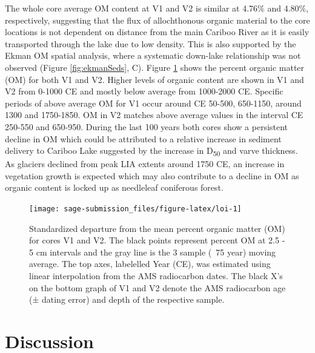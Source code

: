 \documentclass[Royal,times,doublespace,sageh]{sagej}
\begin{document}
The whole core average OM content at V1 and V2 is similar at 4.76\% and
4.80\%, respectively, suggesting that the flux of allochthonous organic
material to the core locations is not dependent on distance from the
main Cariboo River as it is easily transported through the lake due to
low density. This is also supported by the Ekman OM spatial analysis,
where a systematic down-lake relationship was not observed (Figure
\ref{fig:ekmanSeds}, C). Figure \ref{fig:loi} shows the percent organic
matter (OM) for both V1 and V2. Higher levels of organic content are
shown in V1 and V2 from 0-1000 CE and mostly below average from
1000-2000 CE. Specific periods of above average OM for V1 occur around
CE 50-500, 650-1150, around 1300 and 1750-1850. OM in V2 matches above
average values in the interval CE 250-550 and 650-950. During the last
100 years both cores show a persistent decline in OM which could be
attributed to a relative increase in sediment delivery to Cariboo Lake
suggested by the increase in D\textsubscript{50} and varve thickness. As
glaciers declined from peak LIA extents around 1750 CE, an increase in
vegetation growth is expected which may also contribute to a decline in
OM as organic content is locked up as needleleaf coniferous forest.

\begin{figure}

{\centering \texttt{[image: sage-submission\_files/figure-latex/loi-1]} 

}

\caption{Standardized departure from the mean percent organic matter (OM) for cores V1 and V2. The black points represent percent OM at 2.5 - 5 cm intervals and the gray line is the 3 sample (~75 year) moving average. The top axes, labelelled Year (CE), was estimated using linear interpolation from the AMS radiocarbon dates. The black X's on the bottom graph of V1 and V2 denote the AMS radiocarbon age (± dating error) and depth of the respective sample.\label{loi}}\label{fig:loi}
\end{figure}

\hypertarget{discussion}{%
\section{Discussion}\label{discussion}}
\end{document}
